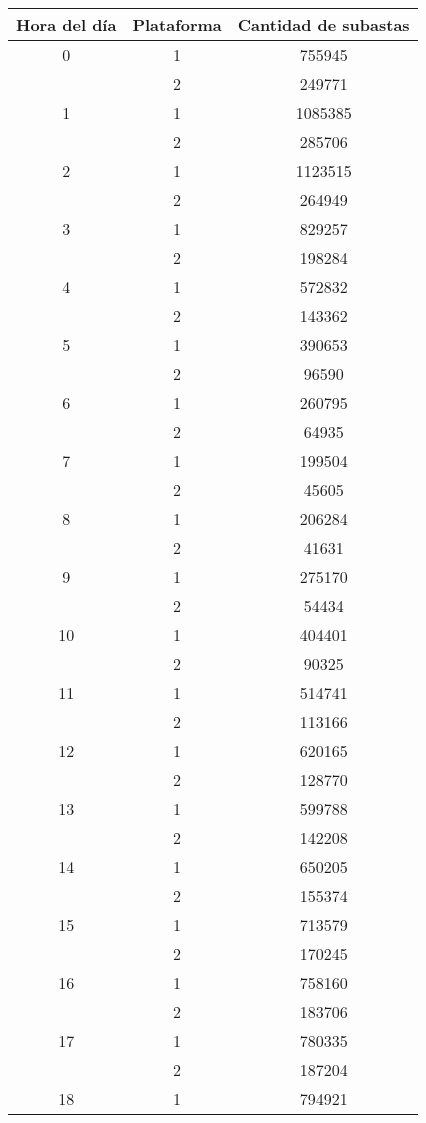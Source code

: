 \begin{center}
 	\begin{tabular}{ |c|c|c| }
    	\hline
        Hora del día & Plataforma & Cantidad de subastas \\
        \hline\hline
		0	&	1	&	755945 \\
			&	2 	&	249771 \\
		\hline
		1 	&	1	& 	1085385 \\
			&	2	& 	285706 \\
		\hline
		2 	&	1	& 	1123515 \\
			&	2	& 	264949 \\
		\hline
		3 	&	1	& 	829257 \\
			&	2	& 	198284 \\
		\hline
		4 	&	1	& 	572832 \\
			&	2	& 	143362 \\
		\hline
		5 	&	1	& 	390653 \\
			&	2	& 	96590 \\
		\hline
		6 	&	1	& 	260795 \\
			&	2	& 	64935 \\
		\hline
		7 	&	1	& 	199504 \\
			&	2	& 	45605 \\
		\hline
		8 	&	1	&	206284 \\
			&	2	& 	41631 \\
		\hline
		9 	&	1 	&	275170 \\
			&	2	& 	54434 \\
		\hline
		10 	&	1	& 	404401 \\
			&	2	& 	90325 \\
		\hline
		11 	&	1	& 	514741 \\
			&	2	& 	113166 \\
		\hline
		12 	&	1	& 	620165 \\
			&	2	& 	128770 \\
		\hline
		13 	&	1	& 	599788 \\
			&	2	& 	142208 \\
		\hline
		14 	&	1	& 	650205 \\
			&	2	& 	155374 \\
		\hline
		15 	&	1	& 	713579 \\
			&	2	& 	170245 \\
		\hline
		16 	&	1	& 	758160 \\
			&	2	& 	183706 \\
		\hline
		17 	&	1	& 	780335 \\
			&	2	& 	187204 \\
		\hline
		18 	&	1	& 	794921 \\

\end{tabular}
\end{center}

